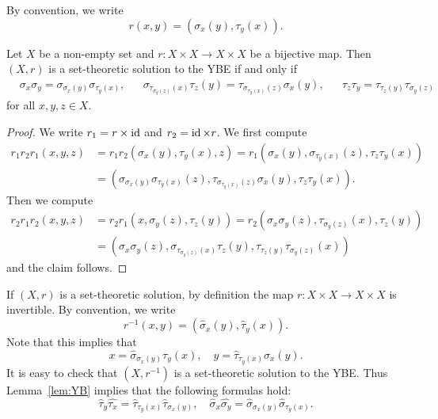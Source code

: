 By convention, we write
\[
r(x,y)=(\sigma_x(y),\tau_y(x)).
\]

\begin{lemma}
    \label{lem:YB}
    Let $X$ be a non-empty set and $r\colon X\times X\to X\times X$ be a bijective map.
    Then $(X,r)$ is a set-theoretic solution to the YBE if and only if 
    \begin{align*}
        &\sigma_x\sigma_y = \sigma_{\sigma_x(y)}\sigma_{\tau_y(x)},&
        &\sigma_{\tau_{\sigma_y(z)}(x)}\tau_z(y)=\tau_{\sigma_{\tau_y(x)}(z)}\sigma_x(y),&
        &\tau_z\tau_y=\tau_{\tau_z(y)}\tau_{\sigma_y(z)}
    \end{align*}
    for all $x,y,z\in X$. 
\end{lemma}

\begin{proof}
    We write $r_1=r\times\operatorname{id}$ and $r_2=\operatorname{id}\times r$. We first compute
    \begin{align*}
        r_1r_2r_1(x,y,z)&=r_1r_2(\sigma_x(y),\tau_y(x),z)
        =r_1(\sigma_x(y),\sigma_{\tau_y(x)}(z),\tau_z\tau_y(x))\\
        &=\left(\sigma_{\sigma_x(y)}\sigma_{\tau_y(x)}(z),\tau_{\sigma_{\tau_y(x)}(z)}\sigma_x(y),\tau_z\tau_y(x)\right).
    \end{align*}
    Then we compute
    \begin{align*}
        r_2r_1r_2(x,y,z)&=r_2r_1(x,\sigma_y(z),\tau_z(y))
        =r_2(\sigma_x\sigma_y(z),\tau_{\sigma_y(z)}(x),\tau_z(y))\\
        &=\left(\sigma_x\sigma_y(z),\sigma_{\tau_{\sigma_y(z)}(x)}\tau_z(y),\tau_{\tau_z(y)}\tau_{\sigma_y(z)}(x)\right)
    \end{align*}
    and the claim follows.    
\end{proof}

If $(X,r)$ is a set-theoretic solution, by definition the map $r\colon X\times X\to X\times X$ is 
invertible. By convention, we write 
 \[
 r^{-1}(x,y)=(\widehat{\sigma}_x(y),\widehat{\tau}_y(x)).
 \]
 Note that this implies that
 \[
 x=\widehat{\sigma}_{\sigma_x(y)}\tau_y(x),\quad
 y=\widehat{\tau}_{\tau_y(x)}\sigma_x(y).
 \]
 It is easy to check that $(X,r^{-1})$ is a set-theoretic solution to the YBE. Thus Lemma~\ref{lem:YB} implies that 
 the following formulas hold:
 \[
 \widehat{\tau}_y\widehat{\tau_x}=\widehat{\tau}_{\tau_y(x)}\widehat{\tau}_{\sigma_x(y)},
 \quad
 \widehat{\sigma}_x\widehat{\sigma_y}=\widehat{\sigma}_{\sigma_x(y)}\widehat{\sigma}_{\tau_y(x)}.
 \]

